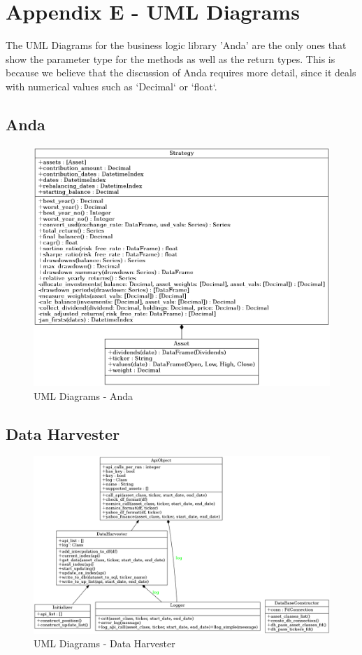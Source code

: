 \documentclass[main.tex]{subfiles}
\begin{document}
\section{Appendix E - UML Diagrams}
\label{umls}

The UML Diagrams for the business logic library 'Anda' are the only ones that show the parameter type for the methods as well as the return types.
This is because we believe that the discussion of Anda requires more detail, since it deals with numerical values such as `Decimal` or `float`.

\subsection{Anda}

\begin{figure}[H]
   \centering
   \includegraphics[scale=0.8]{Report/08Appendices/084UML/084Pictures/classes_analyse_data.png}
   \caption{UML Diagrams - Anda}
\end{figure}

\subsection{Data Harvester}

\begin{figure}[H]
   \centering
   \includegraphics[scale=0.8]{Report/08Appendices/084UML/084Pictures/classes_dhav_core.png}
   \caption{UML Diagrams - Data Harvester}
\end{figure}
\end{document}
